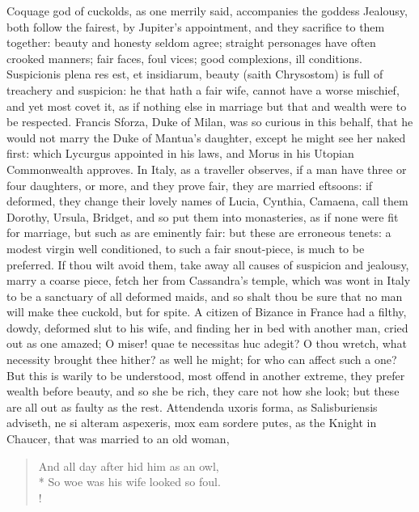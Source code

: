 {Coquage god of cuckolds, as one merrily said, accompanies the
goddess Jealousy, both follow the fairest, by Jupiter's appointment,
and they sacrifice to them together: beauty and honesty seldom agree;
straight personages have often crooked manners; fair faces, foul vices;
good complexions, ill conditions. Suspicionis plena res est, et
insidiarum, beauty (saith Chrysostom) is full of treachery and
suspicion: he that hath a fair wife, cannot have a worse mischief, and
yet most covet it, as if nothing else in marriage but that and wealth
were to be respected. Francis Sforza, Duke of Milan, was so
curious in this behalf, that he would not marry the Duke of Mantua's
daughter, except he might see her naked first: which Lycurgus appointed
in his laws, and Morus in his Utopian Commonwealth approves. In
Italy, as a traveller observes, if a man have three or four daughters,
or more, and they prove fair, they are married eftsoons: if deformed,
they change their lovely names of Lucia, Cynthia, Camaena, call them
Dorothy, Ursula, Bridget, and so put them into monasteries, as if none
were fit for marriage, but such as are eminently fair: but these are
erroneous tenets: a modest virgin well conditioned, to such a fair
snout-piece, is much to be preferred. If thou wilt avoid them, take
away all causes of suspicion and jealousy, marry a coarse piece, fetch
her from Cassandra's temple, which was wont in Italy to be a
sanctuary of all deformed maids, and so shalt thou be sure that no man
will make thee cuckold, but for spite. A citizen of Bizance in France
had a filthy, dowdy, deformed slut to his wife, and finding her in bed
with another man, cried out as one amazed; O miser! quae te necessitas
huc adegit? O thou wretch, what necessity brought thee hither? as well
he might; for who can affect such a one? But this is warily to be
understood, most offend in another extreme, they prefer wealth before
beauty, and so she be rich, they care not how she look; but these are
all out as faulty as the rest. Attendenda uxoris forma, as
Salisburiensis adviseth, ne si alteram aspexeris, mox eam sordere
putes, as the Knight in Chaucer, that was married to an old woman,\label{mention:chaucer-quote-postface}
{
\verselinenumbersleft
{}
{\gothfont
\begin{verse}
And all day after hid him as an owl,\\*
So woe was his wife looked so foul.\\!
\end{verse}
}
\verselinenumbersright
}

}
